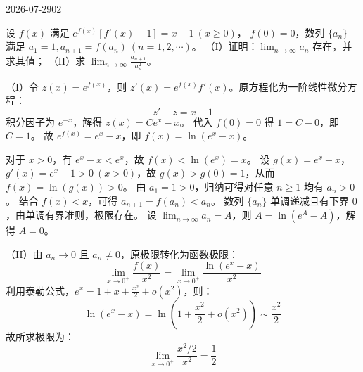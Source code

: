 \begin{mistake}{2026-07-29}{02}

\begin{problemcontent}
设 \(f(x)\) 满足 \(e^{f(x)}[f'(x) - 1] = x - 1\ (x \ge 0)\)， \(f(0) = 0\)，数列 \(\{a_n\}\) 满足 \(a_1 = 1, a_{n+1} = f(a_n)\ (n=1,2,\cdots)\)。
（I）证明：\(\lim_{n \to \infty} a_n\) 存在，并求其值；
（II）求 \(\lim_{n \to \infty} \frac{a_{n+1}}{a_n^2}\)。
\end{problemcontent}

\begin{solutioncontent}
（I）令 \(z(x) = e^{f(x)}\)，则 \(z'(x) = e^{f(x)}f'(x)\)。原方程化为一阶线性微分方程：
\[ z' - z = x - 1 \]
积分因子为 \(e^{-x}\)，解得 \(z(x) = C e^x - x\)。
代入 \(f(0) = 0\) 得 \(1 = C - 0\)，即 \(C = 1\)。
故 \(e^{f(x)} = e^x - x\)，即 \(f(x) = \ln(e^x - x)\)。

对于 \(x > 0\)，有 \(e^x - x < e^x\)，故 \(f(x) < \ln(e^x) = x\)。
设 \(g(x) = e^x - x\)，\(g'(x) = e^x - 1 > 0\ (x>0)\)，故 \(g(x) > g(0) = 1\)，从而 \(f(x) = \ln(g(x)) > 0\)。
由 \(a_1 = 1 > 0\)，归纳可得对任意 \(n \ge 1\) 均有 \(a_n > 0\)。
结合 \(f(x) < x\)，可得 \(a_{n+1} = f(a_n) < a_n\)。
数列 \(\{a_n\}\) 单调递减且有下界 \(0\)，由单调有界准则，极限存在。
设 \(\lim_{n \to \infty} a_n = A\)，则 \(A = \ln(e^A - A)\)，解得 \(A = 0\)。

（II）由 \(a_n \to 0\) 且 \(a_n \neq 0\)，原极限转化为函数极限：
\[ \lim_{x \to 0^+} \frac{f(x)}{x^2} = \lim_{x \to 0^+} \frac{\ln(e^x - x)}{x^2} \]
利用泰勒公式，\(e^x = 1 + x + \frac{x^2}{2} + o(x^2)\)，则：
\[ \ln(e^x - x) = \ln\left(1 + \frac{x^2}{2} + o(x^2)\right) \sim \frac{x^2}{2} \]
故所求极限为：
\[ \lim_{x \to 0^+} \frac{x^2/2}{x^2} = \frac{1}{2} \]
\end{solutioncontent}


\end{mistake}
